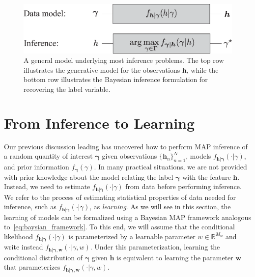 \documentclass[oneside,11pt]{amsart}
\def\h{{\boldsymbol{h}}}
\theoremstyle{remark}
\begin{document}
\begin{figure}[h]
	\begin{center}
		\includegraphics[width=.6\textwidth]{Inference_Fig1_new.eps}
		\caption{{\small A general model underlying most inference problems. The top row illustrates the generative model for the observations $\h$, while the bottom row illustrates the Bayesian inference formulation for recovering the label variable.}}
		\label{fig:ch_inference_fig1}
	\end{center}
\end{figure}

\section{From Inference to Learning}
Our previous discussion leading has uncovered how to perform MAP inference of a random quantity of interest \( \boldsymbol{\gamma} \) given observations \( \{ \boldsymbol{h}_n \}_{n=1}^N \), models \( f_{\boldsymbol{h} | \boldsymbol{\gamma} } \left( \cdot | {\gamma} \right) \), and prior information \( f_{\boldsymbol{\gamma}}(\gamma) \). In many practical situations, we are not provided with prior knowledge about the model relating the label \( \boldsymbol{\gamma} \) with the feature \( \boldsymbol{h} \). Instead, we need to estimate \( f_{\boldsymbol{h} | \boldsymbol{\gamma} } \left( \cdot | {\gamma} \right) \) from data before performing inference. We refer to the process of estimating statistical properties of data needed for inference, such as \( f_{\boldsymbol{h} | \boldsymbol{\gamma} } \left( \cdot | {\gamma} \right) \), as \emph{learning}. As we will see in this section, the learning of models can be formalized using a Bayesian MAP framework analogous to~\eqref{eq:baysian_framework}. To this end, we will assume that the conditional likelihood \( f_{\boldsymbol{h} | \boldsymbol{\gamma} } \left( \cdot | {\gamma} \right) \) is parameterized by a learnable parameter \( w \in \mathds{R}^{M_w} \) and write instead \( f_{\boldsymbol{h} | \boldsymbol{\gamma}, \boldsymbol{w} } \left( \cdot | {\gamma}, w \right) \). Under this parameterization, learning the conditional distribution of \( \boldsymbol{\gamma} \) given \( \boldsymbol{h} \) is equivalent to learning the parameter \( \boldsymbol{w} \) that parameterizes \( f_{\boldsymbol{h} | \boldsymbol{\gamma}, \boldsymbol{w} } \left( \cdot | {\gamma}, w \right) \).
\end{document}
